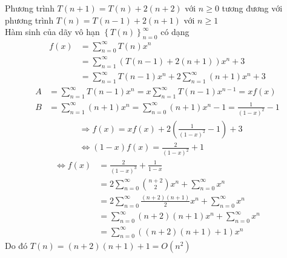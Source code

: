 \documentclass[12pt, a4paper, fleqn]{article}
\begin{document}
Phương trình $T(n + 1) = T(n) + 2(n + 2)$ với $n \geq 0$ tương đương với phương trình $T(n) = T(n - 1) + 2(n + 1)$ với $n \geq 1$\\
Hàm sinh của dãy vô hạn $\left\{T(n)\right\}_{n = 0}^ {\infty}$ có dạng
\setlength{\abovedisplayskip}{3pt}%
\setlength{\belowdisplayskip}{3pt}%
\begin{align*}
f(x) &= \sum_{n = 0} ^ {\infty}T(n)x^ n\\
	 &= \sum_{n = 1} ^ {\infty}(T(n - 1) + 2(n + 1))x^ n + 3\\
	 &= \sum_{n = 1} ^ {\infty}T(n - 1)x^ n + 2\sum_{n = 1} ^ {\infty}(n + 1)x^ n + 3
\end{align*}
\setlength{\abovedisplayskip}{3pt}%
\setlength{\belowdisplayskip}{3pt}%
\begin{align*}
A &= \sum_{n = 1} ^ {\infty}T(n - 1)x^ n = x\sum_{n = 1} ^ {\infty}T(n - 1)x^ {n - 1} = xf(x)\\
B &= \sum_{n = 1} ^ {\infty}(n + 1)x^ n = \sum_{n = 0} ^ {\infty}(n + 1)x^ n - 1 = \frac{1}{(1 - x) ^ 2} - 1
\end{align*}
\setlength{\abovedisplayskip}{3pt}%
\setlength{\belowdisplayskip}{3pt}%
\begin{align*}
&\Rightarrow f(x) = xf(x) + 2\left(\frac{1}{(1 - x) ^ 2} - 1\right) + 3\\
&\Leftrightarrow(1 - x)f(x) = \frac{2}{(1 - x) ^ 2} + 1
\end{align*}
\setlength{\abovedisplayskip}{3pt}%
\setlength{\belowdisplayskip}{3pt}%
\begin{align*}
\Leftrightarrow f(x) &= \frac{2}{(1 - x) ^ 3}+\frac{1}{1 - x}\\
					 &= 2\sum_{n = 0} ^ {\infty} {{n + 2}\choose{2}}x^ n + \sum_{n = 0}^ {\infty}x^ n\\
					 &= 2\sum_{n = 0} ^ {\infty}\frac{(n + 2)(n + 1)}{2}x^ n + \sum_{n = 0}^ {\infty}x^ n\\
					 &= \sum_{n = 0} ^ {\infty}(n + 2)(n + 1)x^ n + \sum_{n = 0}^ {\infty}x^ n\\
					 &= \sum_{n = 0} ^ {\infty}((n + 2)(n + 1) + 1)x^ n
\end{align*}
Do đó $T(n) = (n + 2)(n + 1) + 1 = O\left(n ^ 2\right)$

\end{document}
